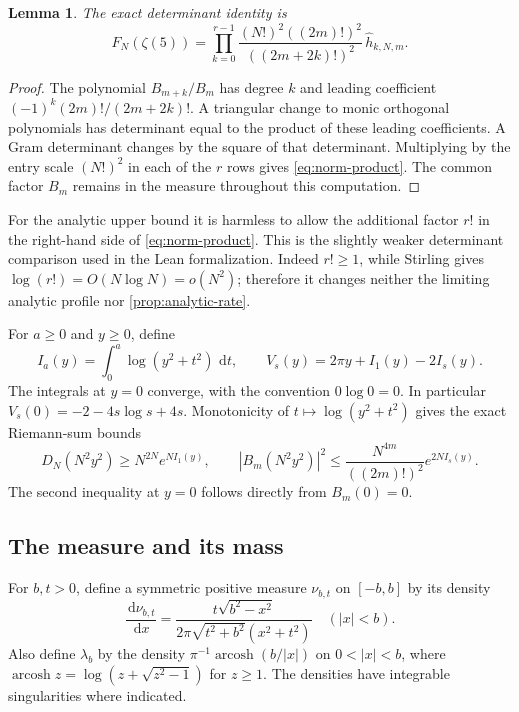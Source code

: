 \documentclass[11pt,letterpaper]{article}
\newtheorem{lemma}[lemma]{Lemma}
\theoremstyle{definition}
\newcommand{\dd}{\,\mathrm d}
\DeclareMathOperator{\arcosh}{arcosh}
\begin{document}
\begin{lemma}\label{lem:norm-product}
The exact determinant identity is
\begin{equation}\label{eq:norm-product}
 F_N(\zeta(5))=
 \prod_{k=0}^{r-1}
 \frac{(N!)^2((2m)!)^2}{((2m+2k)!)^2}\,
 \widehat h_{k,N,m}.
\end{equation}
\end{lemma}
\begin{proof}
The polynomial $B_{m+k}/B_m$ has degree $k$ and leading coefficient
$(-1)^k(2m)!/(2m+2k)!$. A triangular change to monic orthogonal polynomials
has determinant equal to the product of these leading coefficients.
A Gram determinant changes by the square of that determinant.
Multiplying by the entry scale $(N!)^2$ in each of the $r$ rows gives
\eqref{eq:norm-product}. The common factor $B_m$ remains in the measure
throughout this computation.
\end{proof}

For the analytic upper bound it is harmless to allow the additional
factor $r!$ in the right-hand side of \eqref{eq:norm-product}.
This is the slightly weaker determinant comparison used in the
Lean formalization. Indeed $r!\ge1$, while Stirling gives
$\log(r!)=O(N\log N)=o(N^2)$; therefore it changes neither the
limiting analytic profile nor \cref{prop:analytic-rate}.

For $a\ge0$ and $y\ge0$, define
\begin{equation}\label{eq:external-field}
 I_a(y)=\int_0^a\log(y^2+t^2)\,\dd t,\qquad
 V_s(y)=2\pi y+I_1(y)-2I_s(y).
\end{equation}
The integrals at $y=0$ converge, with the convention $0\log0=0$.
In particular $V_s(0)=-2-4s\log s+4s$.
Monotonicity of $t\mapsto\log(y^2+t^2)$ gives the exact Riemann-sum bounds
\begin{equation}\label{eq:riemann-weight}
 D_N(N^2y^2)\ge N^{2N}e^{NI_1(y)},\qquad
 |B_m(N^2y^2)|^2
 \le\frac{N^{4m}}{((2m)!)^2}e^{2NI_s(y)}.
\end{equation}
The second inequality at $y=0$ follows directly from $B_m(0)=0$.

\subsection{The measure and its mass}
For $b,t>0$, define a symmetric positive measure $\nu_{b,t}$ on $[-b,b]$
by its density
\begin{equation}\label{eq:nu-density}
 \frac{\dd\nu_{b,t}}{\dd x}
 =\frac{t\sqrt{b^2-x^2}}
 {2\pi\sqrt{t^2+b^2}(x^2+t^2)}
 \quad (|x|<b).
\end{equation}
Also define $\lambda_b$ by the density
$\pi^{-1}\arcosh(b/|x|)$ on $0<|x|<b$, where
$\arcosh z=\log(z+\sqrt{z^2-1})$ for $z\ge1$.
The densities have integrable singularities where indicated.
\end{document}
